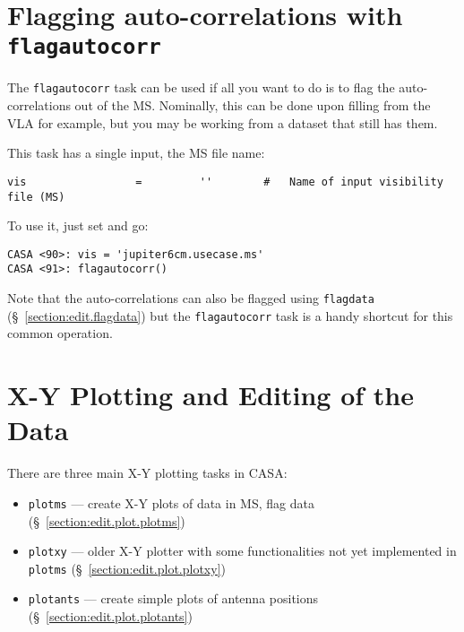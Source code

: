  
\section{Flagging auto-correlations with {\tt flagautocorr}}
\label{section:edit.flagautocorr}

The {\tt flagautocorr} task can be used if all you want to do
is to flag the auto-correlations out of the MS.  Nominally,
this can be done upon filling from the VLA for example, but
you may be working from a dataset that still has them.

This task has a single input, the MS file name:
\small
\begin{verbatim}
vis                 =         ''        #   Name of input visibility file (MS)
\end{verbatim}
\normalsize
To use it, just set and go:
\small
\begin{verbatim}
CASA <90>: vis = 'jupiter6cm.usecase.ms'                                         
CASA <91>: flagautocorr()
\end{verbatim}
\normalsize

Note that the auto-correlations can also be flagged using 
{\tt flagdata} (\S~\ref{section:edit.flagdata}) but the 
{\tt flagautocorr} task is a handy shortcut for this common
operation.

\section{X-Y Plotting and Editing of the Data}
\label{section:edit.plot}

There are three main X-Y plotting tasks in CASA:
\begin{itemize}
   \item {\tt plotms} --- create X-Y plots of data in MS, flag data
      (\S~\ref{section:edit.plot.plotms})
   \item {\tt plotxy} --- older X-Y plotter with some functionalities not yet implemented in {\tt plotms}
      (\S~\ref{section:edit.plot.plotxy})
   \item {\tt plotants} --- create simple plots of antenna positions
      (\S~\ref{section:edit.plot.plotants})
\end{itemize}

